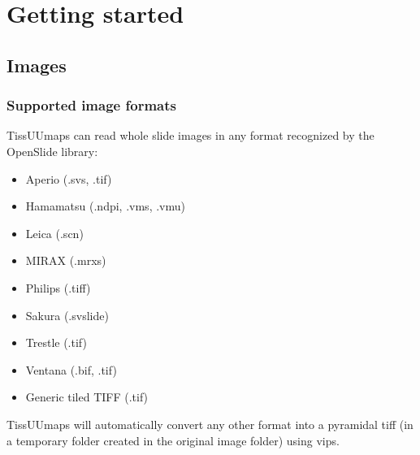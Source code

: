 \documentclass[letterpaper,10pt,english,openany,oneside]{sphinxmanual}
\begin{document}
\sphinxstepscope


\chapter{Getting started}
\label{\detokenize{docs/starting/index:getting-started}}\label{\detokenize{docs/starting/index::doc}}
\sphinxstepscope


\section{Images}
\label{\detokenize{docs/starting/images:images}}\label{\detokenize{docs/starting/images::doc}}

\subsection{Supported image formats}
\label{\detokenize{docs/starting/images:supported-image-formats}}
\sphinxAtStartPar
TissUUmaps can read whole slide images in any format recognized by the OpenSlide library:
\begin{itemize}
\item {} 
\sphinxAtStartPar
Aperio (.svs, .tif)

\item {} 
\sphinxAtStartPar
Hamamatsu (.ndpi, .vms, .vmu)

\item {} 
\sphinxAtStartPar
Leica (.scn)

\item {} 
\sphinxAtStartPar
MIRAX (.mrxs)

\item {} 
\sphinxAtStartPar
Philips (.tiff)

\item {} 
\sphinxAtStartPar
Sakura (.svslide)

\item {} 
\sphinxAtStartPar
Trestle (.tif)

\item {} 
\sphinxAtStartPar
Ventana (.bif, .tif)

\item {} 
\sphinxAtStartPar
Generic tiled TIFF (.tif)

\end{itemize}

\sphinxAtStartPar
TissUUmaps will automatically convert any other format into a pyramidal tiff (in a temporary  folder created in the original image folder) using vips.
\end{document}
